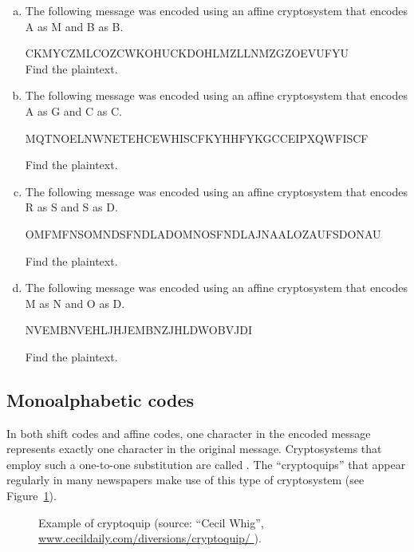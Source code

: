 \begin{exercise}{}
\begin{enumerate}[(a)]
\item
The following message was encoded using an affine cryptosystem that encodes A as M and B as B. 
\medskip

CKMYCZMLCOZCWKOHUCKDOHLMZLLNMZGZOEVUFYU\\

\noindent
Find the plaintext.
\item
The following message was encoded using an affine cryptosystem that encodes A as G and C as C.
\medskip

MQTNOELNWNETEHCEWHISCFKYHHFYKGCCEIPXQWFISCF

\noindent
Find the plaintext.
\item
The following message was encoded using an affine cryptosystem that encodes R as S and S as D.
\medskip

OMFMFNSOMNDSFNDLADOMNOSFNDLAJNAALOZAUFSDONAU

\noindent
Find the plaintext.

\item
The following message was encoded using an affine cryptosystem that encodes M as N and O as D.
\medskip

NVEMBNVEHLJHJEMBNZJHLDWOBVJDI

\noindent
Find the plaintext.

\end{enumerate}
\end{exercise}

\subsection{Monoalphabetic codes}

In both shift codes and affine codes, one character in the encoded message represents exactly one character in the original message. Cryptosystems that employ such a one-to-one substitution are called .
The ``cryptoquips''  that appear regularly in many newspapers make use of this type of cryptosystem (see Figure~\ref{fig:cryptoquip}).

\begin{figure}[h]
\caption{Example of cryptoquip (source: ``Cecil Whig'', \url{www.cecildaily.com/diversions/cryptoquip/ }).}
\label{fig:cryptoquip}
\end{figure}

